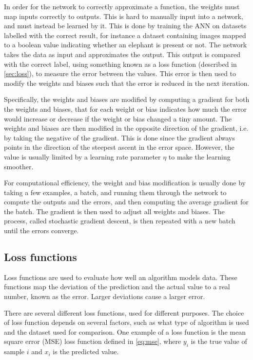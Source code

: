 \documentclass{kththesis}
\begin{document}
In order for the network to correctly approximate a function, the weights must map inputs correctly to outputs. This is hard to manually input into a network, and must instead be learned by it. This is done by training the ANN on datasets labelled with the correct result, for instance a dataset containing images mapped to a boolean value indicating whether an elephant is present or not. The network takes the data as input and approximates the output. This output is compared with the correct label, using something known as a loss function (described in \autoref{sec:loss}), to measure the error between the values. This error is then used to modify the weights and biases such that the error is reduced in the next iteration. \parencite{lecun2015deep} 

Specifically, the weights and biases are modified by computing a gradient for both the weights and biases, that for each weight or bias indicates how much the error would increase or decrease if the weight or bias changed a tiny amount. The weights and biases are then modified in the opposite direction of the gradient, i.e. by taking the negative of the gradient. This is done since the gradient always points in the direction of the steepest ascent in the error space. However, the value is usually limited by a learning rate parameter $\eta$ to make the learning smoother. \parencite{lecun2015deep}

For computational efficiency, the weight and bias modification is usually done by taking a few examples, a batch, and running them through the network to compute the outputs and the errors, and then computing the average gradient for the batch. The gradient is then used to adjust all weights and biases. The process, called stochastic gradient descent, is then repeated with a new batch until the errors converge. \parencite{bottou2010large}

\subsection{Loss functions}
\label{sec:loss}
Loss functions are used to evaluate how well an algorithm models data. These functions map the deviation of the prediction and the actual value to a real number, known as the error. Larger deviations cause a larger error.

There are several different loss functions, used for different purposes. The choice of loss function depends on several factors, such as what type of algorithm is used and the dataset used for comparison. One example of a loss function is the mean square error (MSE) loss function defined in \autoref{eq:mse}, where $y_i$ is the true value of sample $i$ and $x_i$ is the predicted value. \parencite{CommonLo62:online}
\end{document}

